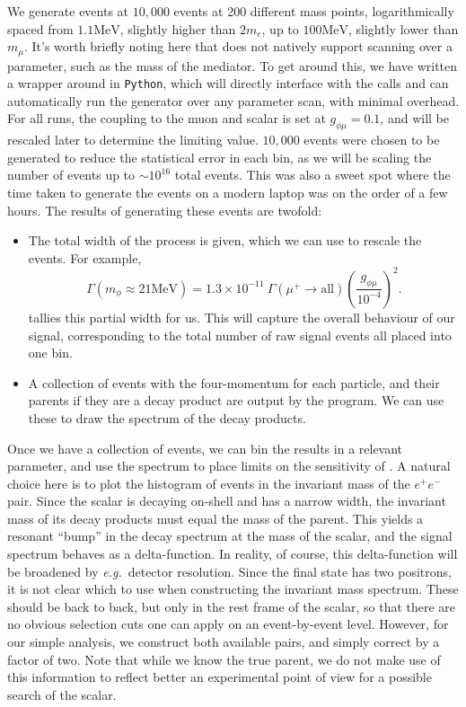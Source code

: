 We generate events at $10,000$ events at 200 different mass points, logarithmically spaced from $1.1\textrm{MeV}$, slightly higher than $2m_e$, up to $100\textrm{MeV}$, slightly lower than $m_\mu$.
It's worth briefly noting here that \madgraph does not natively support scanning over a parameter, such as the mass of the mediator.
To get around this, we have written a wrapper around \madgraph in \texttt{Python}, which will directly interface with the \madgraph calls and can automatically run the generator over any parameter scan, with minimal overhead.
For all runs, the coupling to the muon and scalar is set at $g_{\phi\mu} = 0.1$, and will be rescaled later to determine the limiting value.
$10,000$ events were chosen to be generated to reduce the statistical error in each bin, as we will be scaling the number of events up to $\sim 10^{16}$ total events.
This was also a sweet spot where the time taken to generate the events on a modern laptop was on the order of a few hours.
The results of generating these events are twofold:
\begin{itemize}
    \item{The total width of the process is given, which we can use to rescale the events. For example,
        \begin{equation}
            \Gamma(m_\phi \approx 21\textrm{MeV}) = 1.3\times 10^{-11}~\Gamma(\mu^+ \rightarrow \textrm{all}) \left(\frac{g_{\phi\mu}}{10^{-4}}\right)^2\textrm{.}
        \end{equation}
        \madgraph tallies this partial width for us. This will capture the overall behaviour of our signal, corresponding to the total number of raw signal events all placed into one bin.}
    \item{A collection of events with the four-momentum for each particle, and their parents if they are a decay product are output by the program. We can use these to draw the spectrum of the decay products.}
\end{itemize}

Once we have a collection of events, we can bin the results in a relevant parameter, and use the spectrum to place limits on the sensitivity of \mueee.
A natural choice here is to plot the histogram of events in the invariant mass of the $e^+ e^-$ pair.
Since the scalar is decaying on-shell and has a narrow width, the invariant mass of its decay products must equal the mass of the parent.
This yields a resonant ``bump'' in the decay spectrum at the mass of the scalar, and the signal spectrum behaves as a delta-function.
In reality, of course, this delta-function will be broadened by {\em e.g.}\ detector resolution.
Since the final state has two positrons, it is not clear which to use when constructing the invariant mass spectrum.
These should be back to back, but only in the rest frame of the scalar, so that there are no obvious selection cuts one can apply on an event-by-event level.
However, for our simple analysis, we construct both available pairs, and simply correct by a factor of two.
Note that while we know the true parent, we do not make use of this information to reflect better an experimental point of view for a possible search of the scalar.

